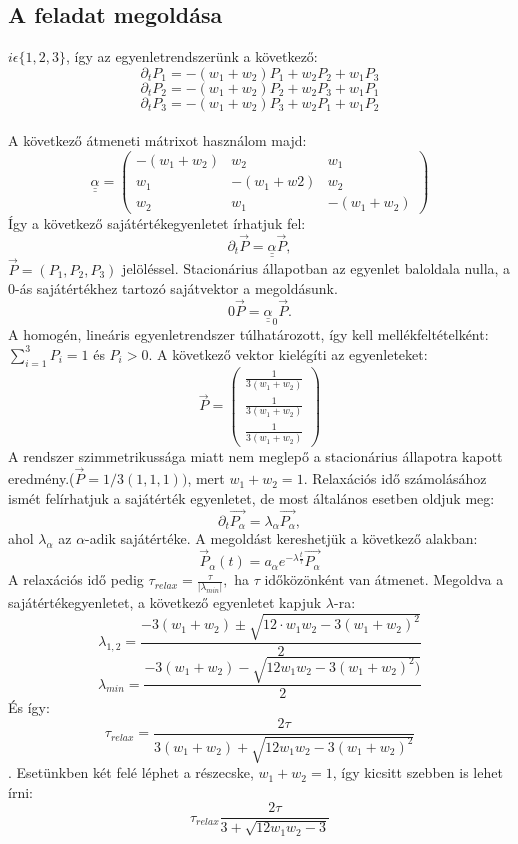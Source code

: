 \documentclass[12pt]{article}
\def\doubleunderline#1{\underline{\underline{#1}}}
\begin{document}
\subsection*{A feladat megoldása}
$i  \epsilon  \{1, 2,3 \}$, így az egyenletrendszerünk a következő:
$$\partial_t P_1 = -(w_1 + w_2)P_1 + w_2P_2 + w_1P_3$$
$$\partial_t P_2 = -(w_1 + w_2)P_2 + w_2P_3 + w_1P_1$$
$$\partial_t P_3 = -(w_1 + w_2)P_3 + w_2P_1 + w_1P_2$$\\
A következő átmeneti mátrixot használom majd:
\[
\doubleunderline\alpha=
  \begin{pmatrix}
    -(w_1+w_2) & w_2 & w_1 \\
    w_1&-(w_1+w2)&w_2\\
    w_2&w_1&-(w_1 + w_2)
    
  \end{pmatrix}
\] Így a következő sajátértékegyenletet írhatjuk fel:
$$\partial _t\vec{P} =\doubleunderline\alpha  \vec{P},$$
$\vec{P} = (P_1, P_2, P_3)$ jelöléssel. Stacionárius állapotban az egyenlet baloldala nulla, a $0$-ás sajátértékhez tartozó sajátvektor a megoldásunk. 
$$0\vec{P} = \doubleunderline\alpha_0 \vec{P}.$$
A homogén, lineáris egyenletrendszer túlhatározott, így kell mellékfeltételként: $\sum^3_{i = 1}P_i = 1$ és $P_i> 0.$ A következő vektor kielégíti az egyenleteket:
\[
\vec{P}=
  \begin{pmatrix}
    \frac{1}{3(w_1+w_2)}\\
   \frac{1}{3(w_1+w_2)}\\
    \frac{1}{3(w_1+w_2)}
    
  \end{pmatrix}
\]
A rendszer szimmetrikussága miatt nem meglepő a stacionárius állapotra kapott eredmény.($\vec{P} = 1/3(1,1,1))$, mert $w_1 + w_2 = 1$. Relaxációs idő számolásához ismét felírhatjuk a sajátérték egyenletet, de most általános esetben oldjuk meg:
$$\partial _t \vec{P_\alpha} = \lambda_\alpha \vec{P_\alpha},$$ 
ahol $\lambda_\alpha $ az $\alpha$-adik sajátértéke. A megoldást kereshetjük a következő alakban:
$$\vec{P}_\alpha (t) = a_\alpha e^{-\lambda \frac{t}{\tau}}\vec{P_\alpha}$$
A relaxációs idő pedig $\tau_{relax} = \frac{\tau}{|\lambda_{min}|}, $ ha $\tau$ időközönként van átmenet. Megoldva a sajátértékegyenletet, a következő egyenletet kapjuk $\lambda$-ra:
$$\lambda_{1,2} = \frac{-3(w_1+w_2)\pm\sqrt{12\cdot w_1w_2-3(w_1+w_2)^2}}{2}$$
$$\lambda_{min} =\frac{-3(w_1+w_2)-\sqrt{12w_1w_2-3(w_1+w_2)^2)}}{2} $$
És így:
$$\tau_{relax} = \frac{2\tau}{3(w_1+w_2)+\sqrt{12w_1w_2-3(w_1+w_2)^2}}$$.
Esetünkben két felé léphet a részecske, $w_1 + w_2 = 1$, így kicsitt szebben is lehet írni:
$$\tau_{relax } \frac{2\tau}{3+\sqrt{12w_1w_2-3}}$$
\end{document}
